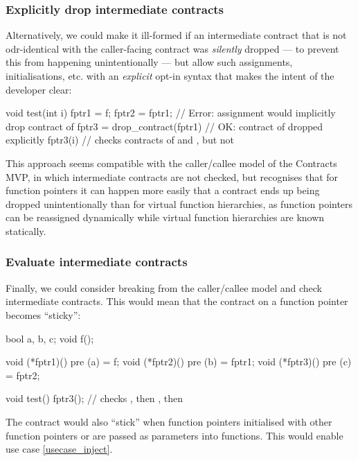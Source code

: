
\subsubsection{Explicitly drop intermediate contracts}
\label{explicitdrop}

Alternatively, we could make it ill-formed if an intermediate contract that is not odr-identical with the caller-facing contract was \emph{silently} dropped --- to prevent this from happening unintentionally --- but allow such assignments, initialisations, etc. with an \emph{explicit} opt-in syntax that makes the intent of the developer clear:
\begin{codeblock}
void test(int i) {
  fptr1 = f;
  fptr2 = fptr1;                // Error: assignment would implicitly drop contract of 
  fptr3 = drop_contract(fptr1)  // OK: contract of  dropped explicitly
  fptr3(i)                      // checks contracts of  and , but not 
}
\end{codeblock}
This approach seems compatible with the caller/callee model of the Contracts MVP, in which intermediate contracts are not checked, but recognises that for function pointers it can happen more easily that a contract ends up being dropped unintentionally than for virtual function hierarchies, as function pointers can be reassigned dynamically while virtual function hierarchies are known statically.


\subsubsection{Evaluate intermediate contracts}
\label{sticky}

Finally, we could consider breaking from the caller/callee model and check intermediate contracts. This would mean that the contract on a function pointer becomes ``sticky'':
\begin{codeblock}
bool a, b, c;
void f();

void (*fptr1)() pre (a) = f;
void (*fptr2)() pre (b) = fptr1;
void (*fptr3)() pre (c) = fptr2;

void test() {
  fptr3();  // checks , then , then 
}
\end{codeblock}
The contract would also ``stick'' when function pointers initialised with other function pointers or are passed as parameters into functions. This would enable use case \ref{usecase_inject}.

